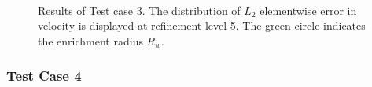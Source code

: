 %
\begin{figure}[!htb]
    \centering
     \\
    \caption
    {Results of Test case 3. The distribution of $L_2$ elementwise error in velocity is displayed at refinement level 5.
    The green circle indicates the enrichment radius $R_w$. }
    \label{fig:mh_tc3_error}
\end{figure}


\subsubsection{Test Case 4}
  
